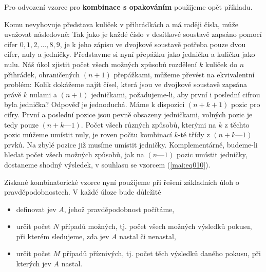 {      Pro odvození vzorce pro \textbf{kombinace s opakováním} použijeme opět příkladu.
      
      
      Komu nevyhovuje představa kuliček v přihrádkách a má raději čísla, může uvažovat následovně: 
      Tak jako je každé číslo v desítkové soustavě zapsáno pomocí cifer \(0, 1, 2, \ldots , 8, 9\), 
      je k jeho zápisu ve dvojkové soustavě potřeba pouze dvou cifer, nuly a jedničky. Představme 
      si nyní přepážku jako jedničku a kuličku jako nulu. Náš úkol zjistit počet všech možných 
      způsobů rozdělení \(k\) kuliček do \(n\) přihrádek, ohraničených \((n+1)\) přepážkami, můžeme 
      převést na ekvivalentní problém: Kolik dokážeme najít čísel, která jsou ve dvojkové soustavě 
      zapsána právě \(k\) nulami a \((n + 1)\) jedničkami, požadujeme-li, aby první i poslední 
      cifrou byla jednička? Odpověď je jednoduchá. Máme k dispozici \((n+k+1)\) pozic pro cifry. 
      První a poslední pozice jsou pevně obsazeny jedničkami, volných pozic je tedy pouze \((n + k 
      — 1)\). Počet všech různých způsobů, kterými na \(k\) z těchto pozic můžeme umístit nuly, je 
      roven počtu kombinací \(k\)-té třídy z \((n + k — 1)\) prvků. Na zbylé pozice již musíme 
      umístit jedničky. Komplementárně, budeme-li hledat počet všech možných způsobů, jak na 
      \((n—1)\) pozic umístit jedničky, dostaneme shodný výsledek, v souhlasu se vzorcem 
      (\ref{mai:eq010}).
      
      
      
      Získané kombinatorické vzorce nyní použijeme při řešení základních úloh o pravděpodobnostech. 
      V každé úloze bude důležité
      \begin{itemize}
        \item definovat jev \(A\), jehož pravděpodobnost počítáme,
        \item určit počet \(N\) případů možných, tj. počet všech možných výsledků pokusu, při 
              kterém sledujeme, zda jev \(A\) nastal či nenastal,
        \item určit počet \(M\) případů příznivých, tj. počet těch výsledků daného pokusu, při 
              kterých jev \(A\) nastal.
      \end{itemize}
      
} %
\printbibliography[heading=subbibliography]
